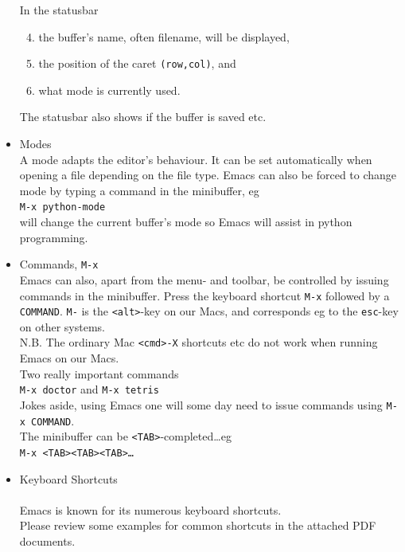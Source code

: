 \documentclass[a4,landscape]{seminar}
\begin{document}
\begin{slide}
\begin{itemize}
\begin{center}
    \end{center}
    \clearpage{}
    In the statusbar
    \begin{enumerate}
      \setcounter{enumi}{3}
    \item the buffer's name, often filename, will be displayed,
    \item the position of the caret \texttt{(row,col)}, and
    \item what mode is currently used.
    \end{enumerate}
    The statusbar also shows if the buffer is saved etc.
  \item Modes\\[1ex]
    A mode adapts the editor's behaviour. It can be set automatically
    when opening a file depending on the file type. Emacs can also be forced
    to change mode by typing a command in the minibuffer, eg\\[1ex]
    \texttt{M-x python-mode}\\[1ex]
    will change the current buffer's mode so Emacs will assist in
    python programming. \clearpage{}
  \item Commands, \texttt{M-x}\\[1ex]
    Emacs can also, apart from the menu- and toolbar, be controlled by
    issuing commands in the minibuffer.  Press the keyboard shortcut
    \texttt{M-x} followed by a \texttt{COMMAND}. \texttt{M-} is the
    \texttt{<alt>}-key on our Macs, and corresponds eg to the
    \texttt{esc}-key on other systems.\\[1ex]
    N.B. The ordinary Mac \texttt{<cmd>-X} shortcuts etc do not work
    when running Emacs on our Macs.\\[1ex]
    Two really important commands\\[1ex]
    \texttt{M-x doctor} and  \texttt{M-x tetris}\\[1ex]
    Jokes aside, using Emacs one will some day need to issue commands
    using \texttt{M-x COMMAND}.\\[1ex]
    The minibuffer can be \texttt{<TAB>}-completed\dots eg\\[1ex]
    \texttt{M-x <TAB><TAB><TAB>\dots}
    \clearpage{}
  \item Keyboard Shortcuts \\\\
    Emacs is known for its numerous keyboard shortcuts. \\
    Please review some examples for common shortcuts in the attached
    PDF documents.\\[1ex]

\end{itemize}
\end{slide}
\end{document}
